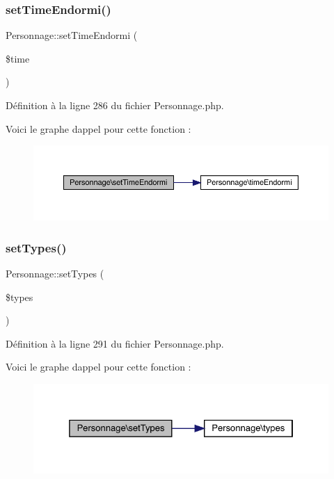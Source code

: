 \subsubsection{\texorpdfstring{set\+Time\+Endormi()}{setTimeEndormi()}}
{\footnotesize\ttfamily Personnage\+::set\+Time\+Endormi (\begin{DoxyParamCaption}\item[{}]{\$time }\end{DoxyParamCaption})}



Définition à la ligne 286 du fichier Personnage.\+php.

Voici le graphe d\textquotesingle{}appel pour cette fonction \+:\nopagebreak
\begin{figure}[H]
\begin{center}
\leavevmode
\includegraphics[width=350pt]{class_personnage_a26cd731a784eaa1ba1e9873219612598_cgraph}
\end{center}
\end{figure}
\mbox{\label{class_personnage_a8ba28978d3fbb538abfb055c0c301b26}} 
\subsubsection{\texorpdfstring{set\+Types()}{setTypes()}}
{\footnotesize\ttfamily Personnage\+::set\+Types (\begin{DoxyParamCaption}\item[{}]{\$types }\end{DoxyParamCaption})}



Définition à la ligne 291 du fichier Personnage.\+php.

Voici le graphe d\textquotesingle{}appel pour cette fonction \+:\nopagebreak
\begin{figure}[H]
\begin{center}
\leavevmode
\includegraphics[width=325pt]{class_personnage_a8ba28978d3fbb538abfb055c0c301b26_cgraph}
\end{center}
\end{figure}
\mbox{\label{class_personnage_a9092edaae21c2eaf48315a022cd5986c}} 
